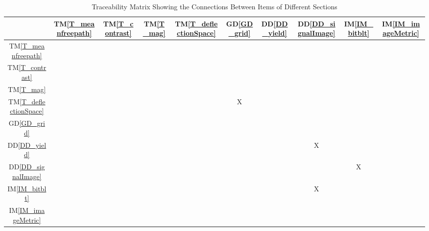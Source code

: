 \documentclass[12pt]{article}
\newcommand{\dref}[1]{GD\ref{#1}}
\newcommand{\ddref}[1]{DD\ref{#1}}
\newcommand{\tref}[1]{TM\ref{#1}}
\newcommand{\iref}[1]{IM\ref{#1}}
\begin{document}
\begin{table}[h!]
\centering
\begin{tabular}{|c|c|c|c|c|c|c|c|c|c|}
\hline        
	& \tref{T_meanfreepath}
  & \tref{T_contrast}
  & \tref{T_mag}
  & \tref{T_deflectionSpace}
  & \dref{GD_grid}
  & \ddref{DD_yield}
  & \ddref{DD_signalImage}
  & \iref{IM_bitblt}
  & \iref{IM_imageMetric}
\\ \hline
\tref{T_meanfreepath}       & & & & & & & & &  \\ \hline
\tref{T_contrast}           & & & & & & & & &  \\ \hline
\tref{T_mag}                & & & & & & & & &  \\ \hline
\tref{T_deflectionSpace}    & & & & &X& & & &  \\ \hline
\dref{GD_grid}              & & & & & & & & &  \\ \hline
\ddref{DD_yield}            & & & & & & &X& &  \\ \hline
\ddref{DD_signalImage}      & & & & & & & &X&  \\ \hline
\iref{IM_bitblt}            & & & & & & &X& &  \\ \hline
\iref{IM_imageMetric}       & & & & & & & & &  \\ \hline
\end{tabular}
\caption{Traceability Matrix Showing the Connections Between Items of Different Sections}
\label{Table:trace}
\end{table}
\end{document}
